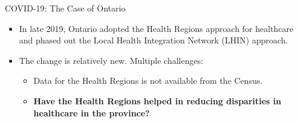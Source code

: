 \documentclass[
  ignorenonframetext,
]{beamer}
\providecommand{\tightlist}{%
  \setlength{\itemsep}{0pt}\setlength{\parskip}{0pt}}\usepackage{longtable,booktabs,array}
\begin{document}
\begin{frame}{COVID-19: The Case of Ontario}
\protect\hypertarget{covid-19-the-case-of-ontario-5}{}
\begin{itemize}[<+->]
\item
  In late 2019, Ontario adopted the Health Regions approach for
  healthcare and phased out the Local Health Integration Network (LHIN)
  approach.
\item
  The change is relatively new. Multiple challenges:

  \begin{itemize}[<+->]
  \tightlist
  \item
    Data for the Health Regions is not available from the Census.
  \item
    \textbf{Have the Health Regions helped in reducing disparities in
    healthcare in the province?}
  \end{itemize}
\end{itemize}
\end{frame}
\end{document}
